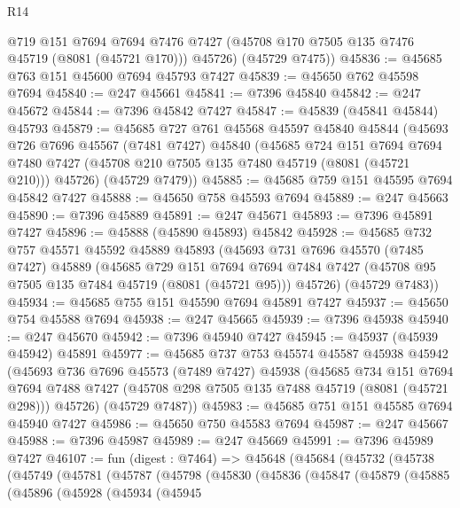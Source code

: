 \begin{lexlean}{R14}
\begin{coremodule}
        @719
        @151
        @7694
        @7694
        @7476
        @7427
        (@45708 @170 @7505 @135 @7476 @45719 (@8081 (@45721 @170)))
        @45726)
      (@45729 @7475))
@45836 := @45685 @763 @151 @45600 @7694 @45793 @7427
@45839 := @45650 @762 @45598 @7694
@45840 := @247 @45661
@45841 := @7396 @45840
@45842 := @247 @45672
@45844 := @7396 @45842 @7427
@45847 := @45839 (@45841 @45844) @45793
@45879 := @45685
    @727
    @761
    @45568
    @45597
    @45840
    @45844
    (@45693
      @726
      @7696
      @45567
      (@7481 @7427)
      @45840
      (@45685
        @724
        @151
        @7694
        @7694
        @7480
        @7427
        (@45708 @210 @7505 @135 @7480 @45719 (@8081 (@45721 @210)))
        @45726)
      (@45729 @7479))
@45885 := @45685 @759 @151 @45595 @7694 @45842 @7427
@45888 := @45650 @758 @45593 @7694
@45889 := @247 @45663
@45890 := @7396 @45889
@45891 := @247 @45671
@45893 := @7396 @45891 @7427
@45896 := @45888 (@45890 @45893) @45842
@45928 := @45685
    @732
    @757
    @45571
    @45592
    @45889
    @45893
    (@45693
      @731
      @7696
      @45570
      (@7485 @7427)
      @45889
      (@45685
        @729
        @151
        @7694
        @7694
        @7484
        @7427
        (@45708 @95 @7505 @135 @7484 @45719 (@8081 (@45721 @95)))
        @45726)
      (@45729 @7483))
@45934 := @45685 @755 @151 @45590 @7694 @45891 @7427
@45937 := @45650 @754 @45588 @7694
@45938 := @247 @45665
@45939 := @7396 @45938
@45940 := @247 @45670
@45942 := @7396 @45940 @7427
@45945 := @45937 (@45939 @45942) @45891
@45977 := @45685
    @737
    @753
    @45574
    @45587
    @45938
    @45942
    (@45693
      @736
      @7696
      @45573
      (@7489 @7427)
      @45938
      (@45685
        @734
        @151
        @7694
        @7694
        @7488
        @7427
        (@45708 @298 @7505 @135 @7488 @45719 (@8081 (@45721 @298)))
        @45726)
      (@45729 @7487))
@45983 := @45685 @751 @151 @45585 @7694 @45940 @7427
@45986 := @45650 @750 @45583 @7694
@45987 := @247 @45667
@45988 := @7396 @45987
@45989 := @247 @45669
@45991 := @7396 @45989 @7427
@46107 := fun (digest : @7464) =>
  @45648
    (@45684
      (@45732
        (@45738
          (@45749
            (@45781
              (@45787
                (@45798
                  (@45830
                    (@45836
                      (@45847
                        (@45879
                          (@45885
                            (@45896
                              (@45928
                                (@45934
                                  (@45945

\end{coremodule}
\end{lexlean}
